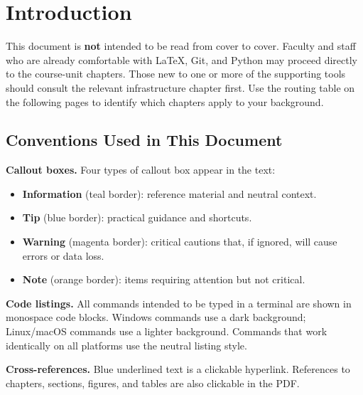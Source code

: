 \chapter{Introduction}

\begin{infobox}
This document is \textbf{not} intended to be read from cover to cover.
Faculty and staff who are already comfortable with \LaTeX{}, Git, and
Python may proceed directly to the course-unit chapters. Those new to
one or more of the supporting tools should consult the relevant
infrastructure chapter first. Use the routing table on the following
pages to identify which chapters apply to your background.
\end{infobox}

\section*{Conventions Used in This Document}

\noindent
\textbf{Callout boxes.} Four types of callout box appear in the text:

\begin{itemize}
    \item \textbf{Information} (teal border): reference material and
          neutral context.
    \item \textbf{Tip} (blue border): practical guidance and
          shortcuts.
    \item \textbf{Warning} (magenta border): critical cautions
          that, if ignored, will cause errors or data loss.
    \item \textbf{Note} (orange border): items requiring attention
          but not critical.
\end{itemize}

\noindent
\textbf{Code listings.} All commands intended to be typed in a
terminal are shown in monospace code blocks. Windows commands use a
dark background; Linux/macOS commands use a lighter background.
Commands that work identically on all platforms use the neutral
listing style.

\noindent
\textbf{Cross-references.} Blue underlined text is a clickable
hyperlink. References to chapters, sections, figures, and tables are
also clickable in the PDF.

